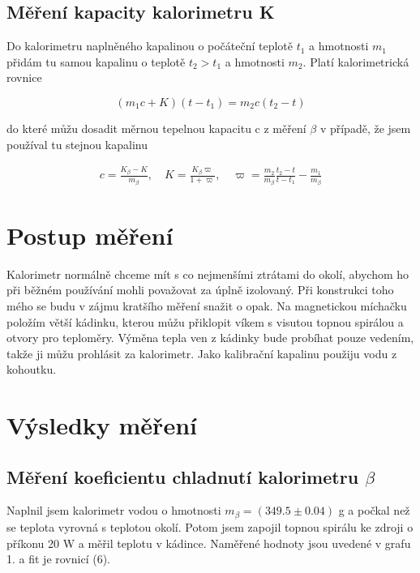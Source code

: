 \documentclass[a4paper,11pt]{article}
\begin{document}
\subsection{Měření kapacity kalorimetru K}

Do kalorimetru naplněného kapalinou o počáteční teplotě $t_1$ a hmotnosti $m_1$ přidám tu samou kapalinu o teplotě $t_2 > t_1$ a hmotnosti $m_2$. Platí kalorimetrická rovnice

\begin{equation}
(m_1c + K)(t-t_1) = m_2c(t_2-t)
\end{equation}

\noindent
do které můžu dosadit měrnou tepelnou kapacitu c z měření $\beta$ v případě, že jsem používal tu stejnou kapalinu 

\begin{align}
  c = \frac{K_{\beta} - K}{m_{\beta}}, \quad K = \frac{K_{\beta} \varpi}{1 + \varpi}, \quad \varpi = \frac{m_2}{m_{\beta}}\frac{t_2 - t}{t - t_1} - \frac{m_1}{m_{\beta}}
\end{align}

\section{Postup měření}

Kalorimetr normálně chceme mít s co nejmenšími ztrátami do okolí, abychom ho při běžném používání mohli považovat za úplně izolovaný. Při konstrukci toho mého se budu v zájmu kratšího měření snažit o opak. Na magnetickou míchačku položím větší kádinku, kterou můžu přiklopit víkem s visutou topnou spirálou a otvory pro teploměry. Výměna tepla ven z kádinky bude probíhat pouze vedením, takže ji můžu prohlásit za kalorimetr. Jako kalibrační kapalinu použiju vodu z kohoutku.

\section{Výsledky měření}

\subsection{Měření koeficientu chladnutí kalorimetru $\beta$}

Naplnil jsem kalorimetr vodou o hmotnosti $m_{\beta} = (349.5 \pm 0.04)$ g a počkal než se teplota vyrovná s teplotou okolí. Potom jsem zapojil topnou spirálu ke zdroji o příkonu 20 W a měřil teplotu v kádince. Naměřené hodnoty jsou uvedené v grafu 1. a fit je rovnicí (6).
\end{document}
